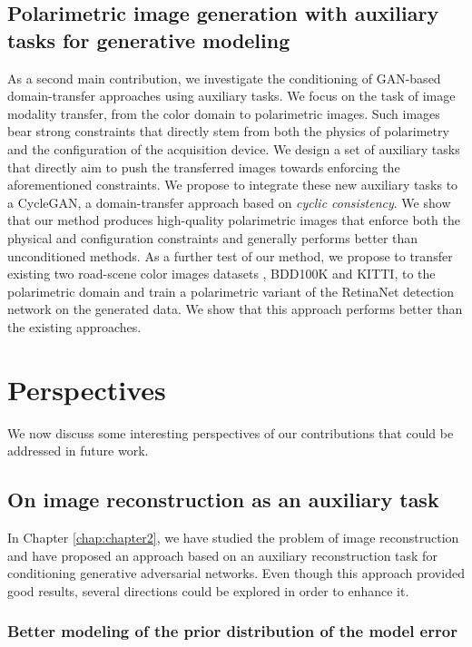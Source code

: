 \subsection*{Polarimetric image generation with auxiliary tasks for generative modeling}

As a second main contribution, we investigate the conditioning of \ac{GAN}-based domain-transfer approaches using auxiliary tasks. We focus on the task of image modality transfer, from the color domain to polarimetric images. Such images bear strong constraints that directly stem from both the physics of polarimetry and the configuration of the acquisition device. We design a set of auxiliary tasks that directly aim to push the transferred images towards enforcing the aforementioned constraints. We propose to integrate these new auxiliary tasks to a CycleGAN, a domain-transfer approach based on \textit{cyclic consistency}. We show that our method produces high-quality polarimetric images that enforce both the physical and configuration constraints and generally performs better than unconditioned methods. As a further test of our method, we propose to transfer existing two road-scene color images datasets , BDD100K and KITTI, to the polarimetric domain and train a polarimetric variant of the RetinaNet detection network on the generated data. We show that this approach performs better than the existing approaches.

\section*{Perspectives}

We now discuss some interesting perspectives of our contributions that could be addressed in future work.

\subsection*{On image reconstruction as an auxiliary task}

In Chapter \ref{chap:chapter2}, we have studied the problem of image reconstruction and have proposed an approach based on an auxiliary reconstruction task for conditioning generative adversarial networks. Even though this approach provided good results, several directions could be explored in order to enhance it.

\subsubsection*{Better modeling of the prior distribution of the model error}

